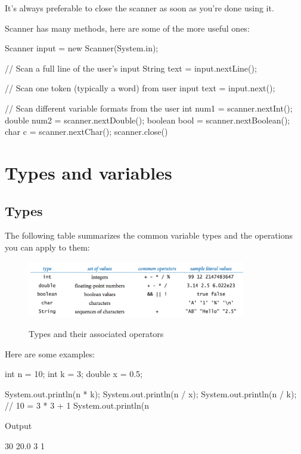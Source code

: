 It's always preferable to close the scanner as soon as you're done using it. 

Scanner has many methods, here are some of the more useful ones:

\begin{code}
Scanner input = new Scanner(System.in);

// Scan a full line of the user's input
String text = input.nextLine(); 

// Scan one token (typically a word) from user input
text = input.next();

// Scan different variable formats from the user
int num1 = scanner.nextInt();
double num2 = scanner.nextDouble();
boolean bool = scanner.nextBoolean();
char c = scanner.nextChar();
scanner.close()

\end{code}


\section{Types and variables}

\subsection{Types}

The following table summarizes the common variable types and the operations you can apply to them:

\begin{figure}[h]
	\centering
	\includegraphics[width=0.85\textwidth]{images/data_types}
	\label{fig:data_types_reference}
	\caption{Types and their associated operators}
\end{figure}

Here are some examples:

\begin{code}
int n = 10;
int k = 3;
double x = 0.5;

System.out.println(n * k); 
System.out.println(n / x); 
System.out.println(n / k); // 10 = 3 * 3 + 1 
System.out.println(n %
\end{code}

Output
\begin{code}
30
20.0
3
1
\end{code}

